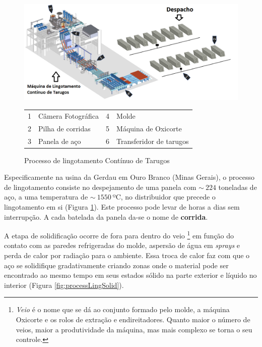  \begin{figure}[htbp]
	\centering
	\includegraphics[width=1.1\linewidth]{figuras/Steel/process.png}
	\caption{Processo de lingotamento Contínuo de Tarugos}
	\begin{tabular}{r@{: }l r@{: }l}
        1 & Câmera Fotográfica & 4 & Molde \\
        2& Pilha de corridas & 5 & Máquina de Oxicorte \\
        3 & Panela de aço& 6 & Transferidor de tarugos \\
    \end{tabular}
	\label{fig:processLing}
\end{figure}

Especificamente na usina da Gerdau em Ouro Branco (Minas Gerais), o processo de lingotamento consiste no despejamento de uma panela com $\sim~224$ toneladas de aço, a uma temperatura de $\sim~1550~$ºC, no distribuidor que precede o lingotamento em si (Figura \ref{fig:processLing}).
%
Este processo pode levar de horas a dias sem interrupção.
%
A cada batelada da panela da-se o nome de \textbf{corrida}.


A etapa de solidificação ocorre de fora para dentro do veio
%
\footnote{\textit{Veio} é o nome que se dá ao conjunto formado pelo molde, a máquina Oxicorte e os rolos de extração e endireitadores. Quanto maior o número de veios, maior a produtividade da máquina, mas mais complexo se torna o seu controle.} 
%
em função do contato com as paredes refrigeradas do molde, aspersão de água em \textit{sprays} e perda de calor por radiação para o ambiente. Essa troca de calor faz com que o aço se solidifique gradativamente criando zonas onde o material pode ser encontrado ao mesmo tempo em seus estados sólido na parte exterior e líquido no interior (Figura \ref{fig:processLingSolid}).

